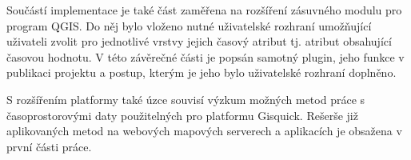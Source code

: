 Součástí implementace je také část zaměřena na rozšíření zásuvného
modulu pro program QGIS. Do něj bylo vloženo nutné uživatelské
rozhraní umožňující uživateli zvolit pro jednotlivé vrstvy jejich
časový atribut tj. atribut obsahující časovou hodnotu. V této
závěrečné části je popsán samotný plugin, jeho funkce v publikaci
projektu a postup, kterým je jeho bylo uživatelské rozhraní doplněno.

S rozšířením platformy také úzce souvisí výzkum možných metod práce s
časoprostorovými daty použitelných pro platformu Gisquick. Rešerše již
aplikovaných metod na webových mapových serverech a aplikacích je
obsažena v první části práce.

